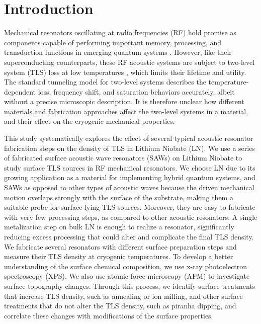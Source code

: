 \documentclass[
 prapplied,
 amsmath,amssymb,
 reprint, longbibliography, superscriptaddress
]{revtex4-2}
\begin{document}
\maketitle

\section{Introduction}
Mechanical resonators oscillating at radio frequencies (RF) hold promise as components capable of performing important memory, processing, and transduction functions in emerging quantum systems \cite{o2010quantum, chu2017quantum, chu2018creation, satzinger2018quantum, sletten2019resolving, hann2019hardware, wollack2021loss, wollack2022quantum, qiao2023developing, bild2023schrodinger}. However, like their superconducting counterparts, these RF acoustic systems are subject to two-level system (TLS) loss at low temperatures \cite{wollack2021loss, andersson2021acoustic, cleland2023studying, luschmann2023surface}, which limits their lifetime and utility. The standard tunneling model for two-level systems describes the temperature-dependent loss, frequency shift, and saturation behaviors \cite{gao2008experimental, behunin2016dimensional} accurately, albeit without a precise microscopic description. It is therefore unclear how different materials and fabrication approaches affect the two-level systems in a material, and their effect on the cryogenic mechanical properties. 

This study systematically explores the effect of several typical acoustic resonator fabrication steps on the density of TLS in Lithium Niobate (LN). We use a series of fabricated surface acoustic wave resonators (SAWs) on Lithium Niobate to study surface TLS sources in RF mechanical resonators. We choose LN due to its growing application as a material for implementing hybrid quantum systems, and SAWs as opposed to other types of acoustic waves because the driven mechanical motion overlaps strongly with the surface of the substrate, making them a suitable probe for surface-lying TLS sources. Moreover, they are easy to fabricate with very few processing steps, as compared to other acoustic resonators. A single metalization step on bulk LN is enough to realize a resonator, significantly reducing excess processing that could alter and complicate the final TLS density. We fabricate several resonators with different surface preparation steps and measure their TLS density at cryogenic temperatures. To develop a better understanding of the surface chemical composition, we use x-ray photoelectron spectroscopy (XPS). We also use atomic force microscopy (AFM) to investigate surface topography changes. Through this process, we identify surface treatments that increase TLS density, such as annealing or ion milling, and other surface treatments that do not alter the TLS density, such as piranha dipping, and correlate these changes with modifications of the surface properties. 
\end{document}
